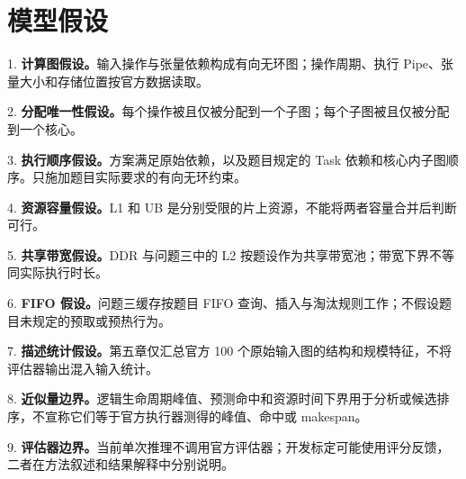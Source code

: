 \documentclass[UTF8,a4paper,zihao=-4]{ctexart}
\numberwithin{equation}{section}
\numberwithin{figure}{section}
\numberwithin{table}{section}
\begin{document}
\section{模型假设}
1. \textbf{计算图假设。}输入操作与张量依赖构成有向无环图；操作周期、执行 Pipe、张量大小和存储位置按官方数据读取。

2. \textbf{分配唯一性假设。}每个操作被且仅被分配到一个子图；每个子图被且仅被分配到一个核心。

3. \textbf{执行顺序假设。}方案满足原始依赖，以及题目规定的 Task 依赖和核心内子图顺序。只施加题目实际要求的有向无环约束。

4. \textbf{资源容量假设。}L1 和 UB 是分别受限的片上资源，不能将两者容量合并后判断可行。

5. \textbf{共享带宽假设。}DDR 与问题三中的 L2 按题设作为共享带宽池；带宽下界不等同实际执行时长。

6. \textbf{FIFO 假设。}问题三缓存按题目 FIFO 查询、插入与淘汰规则工作；不假设题目未规定的预取或预热行为。

7. \textbf{描述统计假设。}第五章仅汇总官方 100 个原始输入图的结构和规模特征，不将评估器输出混入输入统计。

8. \textbf{近似量边界。}逻辑生命周期峰值、预测命中和资源时间下界用于分析或候选排序，不宣称它们等于官方执行器测得的峰值、命中或 makespan。

9. \textbf{评估器边界。}当前单次推理不调用官方评估器；开发标定可能使用评分反馈，二者在方法叙述和结果解释中分别说明。
\end{document}
